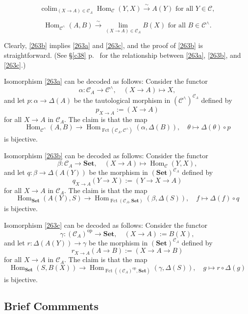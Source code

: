 \documentclass[12pt]{article}
\theoremstyle{remark}
\theoremstyle{definition}
\newcommand{\oo}{\operatorname}
\newcommand{\C}{\mathcal C}
\newcommand{\Set}{\mathbf{Set}}
\DeclareMathOperator*{\colim}{colim}
\DeclareMathOperator{\Hom}{Hom}
\DeclareMathOperator{\op}{op}
\begin{document}
\begin{equation}\label{263b}
\colim_{(X\to A)\in\C_A}\Hom_\C(Y,X)\xrightarrow\sim A(Y)\text{ for all }Y\in\C, 
\end{equation}

\begin{equation}\label{263c}
\Hom_{\C^\wedge}(A,B)\xrightarrow\sim\lim_{(X\to A)\in\C_A}B(X)\text{ for all }B\in\C^\wedge. 
\end{equation}

Clearly, \eqref{263b} implies \eqref{263a} and \eqref{263c}, and the proof of \eqref{263b} is straightforward. (See \S\ref{c38} p.~\pageref{c38} for the relationship between \eqref{263a}, \eqref{263b}, and \eqref{263c}.) 

Isomorphism \eqref{263a} can be decoded as follows: Consider the functor 
$$
\alpha:\C_A\to\C^\wedge,\quad(X\to A)\mapsto X,
$$ 
and let $p:\alpha\to\Delta(A)$ be the tautological morphism in $(\C^\wedge)^{\C_A}$ defined by 
%
\begin{equation}\label{pxa}
p_{X\to A}:=(X\to A)
\end{equation}
% 
for all $X\to A$ in $\C_A$. The claim is that the map 
$$
\Hom_{\C^\wedge}(A,B)\to\Hom_{\oo{Fct}(\C_A,\C^\wedge)}(\alpha,\Delta(B)),\quad\theta\mapsto\Delta(\theta)\circ p
$$ 
is bijective. 

Isomorphism \eqref{263b} can be decoded as follows: Consider the functor 
$$
\beta:\C_A\to\Set,\quad(X\to A)\mapsto\Hom_\C(Y,X), 
$$ 
and let $q:\beta\to\Delta(A(Y))$ be the morphism in $(\Set)^{\C_A}$ defined by 
$$
q_{X\to A}(Y\to X):=(Y\to X\to A)
$$ 
for all $X\to A$ in $\C_A$. The claim is that the map 
$$
\Hom_{\Set}(A(Y),S)\to\Hom_{\oo{Fct}(\C_A,\Set)}(\beta,\Delta(S)),\quad f\mapsto\Delta(f)\circ q
$$ 
is bijective. 

Isomorphism \eqref{263c} can be decoded as follows: Consider the functor 
$$
\gamma:(\C_A)^{\op}\to\Set,\quad(X\to A):=B(X),
$$ 
and let $r:\Delta(A(Y))\to\gamma$ be the morphism in $(\Set)^{\C_A}$ defined by 
$$
r_{X\to A}(A\to B):=(X\to A\to B)
$$ 
for all $X\to A$ in $\C_A$. The claim is that the map 
$$
\Hom_{\Set}(S,B(X))\to\Hom_{\oo{Fct}((\C_A)^{\op},\Set)}(\gamma,\Delta(S)),\quad g\mapsto r\circ\Delta(g)
$$ 
is bijective. 


\subsection{Brief Commments}
\end{document}

